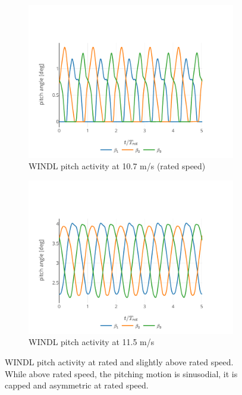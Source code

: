 \begin{figure}
  \centering
  \begin{subfigure}[b]{0.48\textwidth}
      \centering
      \includegraphics[width=\textwidth]{images/pitch_angle_rollout_10_7ms.pdf}
      \caption{WINDL pitch activity at 10.7 m/s (rated speed)}
      \label{fig:pitch-at-rated}
  \end{subfigure}
  \begin{subfigure}[b]{0.48\textwidth}
      \centering
      \includegraphics[width=\textwidth]{images/pitch_angle_rollout_11_5ms.pdf}
      \caption{WINDL pitch activity at 11.5 m/s}
      \label{fig:pitch-above-rated}
  \end{subfigure}
  \caption{WINDL pitch activity at rated and slightly above rated speed. While above rated speed, the pitching motion is sinusodial, it is capped and asymmetric at rated speed.}
  \label{fig:pitch-around-rated}
\end{figure}

